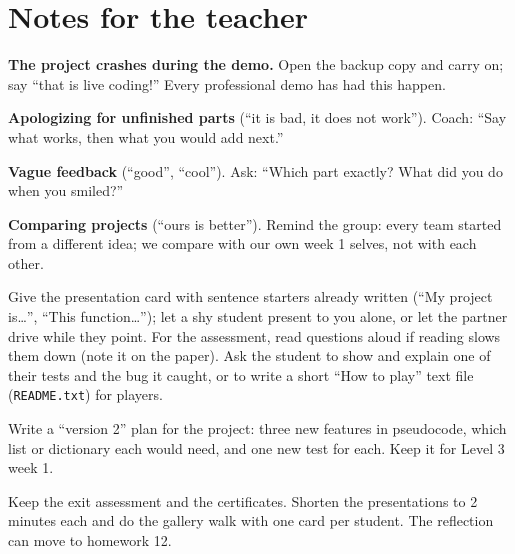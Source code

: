 \section{Notes for the teacher}
\begin{commonmistakes}
  \item \textbf{The project crashes during the demo.} Open the backup copy and carry on; say \enquote{that is live coding!} Every professional demo has had this happen.
  \item \textbf{Apologizing for unfinished parts} (\enquote{it is bad, it does not work}). Coach: \enquote{Say what works, then what you would add next.}
  \item \textbf{Vague feedback} (\enquote{good}, \enquote{cool}). Ask: \enquote{Which part exactly? What did you do when you smiled?}
  \item \textbf{Comparing projects} (\enquote{ours is better}). Remind the group: every team started from a different idea; we compare with our own week 1 selves, not with each other.
\end{commonmistakes}

\begin{differentiation}
\supportpath Give the presentation card with sentence starters already written (\enquote{My project is…},
\enquote{This function…}); let a shy student present to you alone, or let the partner drive while they
point. For the assessment, read questions aloud if reading slows them down (note it on the paper).
\extensionpath Ask the student to show and explain one of their tests and the bug it caught, or to
write a short \enquote{How to play} text file (\texttt{README.txt}) for players.
\end{differentiation}

\begin{stretchchallenge}
Write a \enquote{version 2} plan for the project: three new features in pseudocode, which list or
dictionary each would need, and one new test for each. Keep it for Level 3 week 1.
\end{stretchchallenge}

\begin{teachernote}
Keep the exit assessment and the certificates. Shorten the presentations to 2 minutes each and do the
gallery walk with one card per student. The reflection can move to homework 12.
\end{teachernote}

